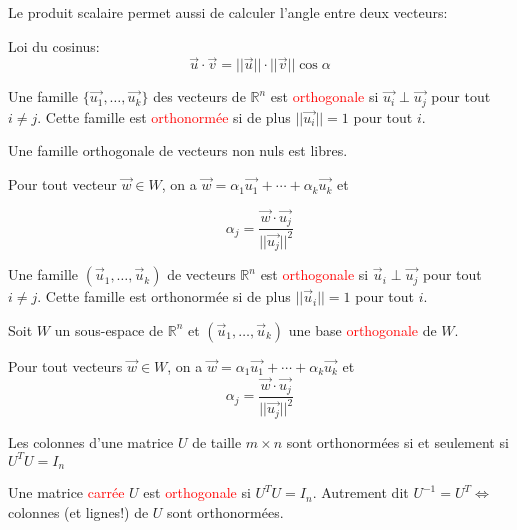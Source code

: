  Le produit scalaire permet aussi de calculer l'angle entre deux vecteurs:
 \begin{theoreme}
     Loi du cosinus:
     \[\vec{u}\cdot \vec{v} = ||\vec{u}||\cdot ||\vec{v}||\cos \alpha\]
 \end{theoreme}
    \begin{definition}
        Une famille $\{\vec{u_1}, \dots, \vec{u_k}\}$ des vecteurs de $\mathbb{R}^n$ est \textcolor{red}{orthogonale} si $\vec{u_i}\perp \vec{u_j}$ pour tout $i \neq j$. Cette famille est \textcolor{red}{orthonormée} si de plus $||\vec{u_i}|| = 1$ pour tout $i$.
    \end{definition}
    \begin{theoreme}
        Une famille orthogonale de vecteurs non nuls est libres.
    \end{theoreme}
    \begin{theoreme}
        Pour tout vecteur $\vec{w} \in W$, on a $\vec{w} = \alpha_1\vec{u_1} + \cdots + \alpha_k\vec{u_k}$ et 
        \begin{formule}
            \[\alpha_j = \frac{\vec{w}\cdot\vec{u_j}}{||\vec{u_j}||^2}\]
        \end{formule}
    \end{theoreme}
    \begin{definition}
        Une famille $(\vec{u}_1, \dots, \vec{u}_k)$ de vecteurs $\mathbb{R}^n$ est \textcolor{red}{orthogonale} si $\vec{u}_i \perp \vec{u_j}$ pour tout $i \neq j$. Cette famille est orthonormée si de plus $||\vec{u}_i|| = 1$ pour tout $i$.
    \end{definition}
    Soit $W$ un sous-espace de $\mathbb{R}^n$ et $(\vec{u}_1, \dots, \vec{u}_k)$ une base \textcolor{red}{orthogonale} de $W$.
    \begin{theoreme}
        Pour tout vecteurs $\vec{w}\in W$, on a $\vec{w} = \alpha_1\vec{u_1} + \cdots + \alpha_k\vec{u_k}$ et
        \[\alpha_j = \frac{\vec{w}\cdot\vec{u_j}}{||\vec{u_j}||^2}\]
    \end{theoreme}
    \begin{theoreme}
        Les colonnes d'une matrice $U$ de taille $m\times n$ sont orthonormées si et seulement si $U^TU = I_n$
    \end{theoreme}
    \begin{definition}
        Une matrice \textcolor{red}{carrée} $U$ est \textcolor{red}{orthogonale} si $U^TU = I_n$. Autrement dit $U^{-1} = U^T \Leftrightarrow$ colonnes (et lignes!) de $U$ sont orthonormées.
    \end{definition}

